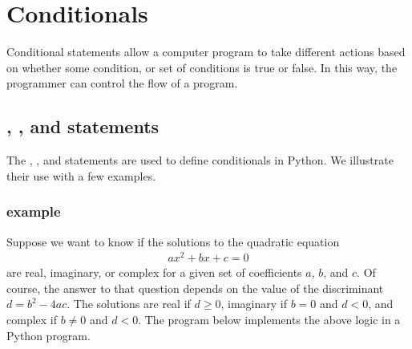 \documentclass[letterpaper,10pt,english]{sphinxmanual}
\begin{document}
\ignorespaces 

\section{Conditionals}
\label{\detokenize{chap6/chap6_loopsconds:conditionals}}\label{\detokenize{chap6/chap6_loopsconds:index-0}}
\sphinxAtStartPar
Conditional statements allow a computer program to take different actions based on whether some condition, or set of conditions is true or false.  In this way, the programmer can control the flow of a program.


\subsection{, , and  statements}
\label{\detokenize{chap6/chap6_loopsconds:if-elif-and-else-statements}}
\sphinxAtStartPar
The , , and  statements are used to define conditionals in Python.  We illustrate their use with a few examples.


\subsubsection{\sphinxhyphen{}\sphinxhyphen{} example}
\label{\detokenize{chap6/chap6_loopsconds:if-elif-else-example}}
\sphinxAtStartPar
Suppose we want to know if the solutions to the quadratic equation
\begin{equation*}
\begin{split}ax^2 + bx + c = 0\end{split}
\end{equation*}
\sphinxAtStartPar
are real, imaginary, or complex for a given set of coefficients \(a\), \(b\), and \(c\).  Of course, the answer to that question depends on the value of the discriminant \(d=b^2-4ac\).  The solutions are real if \(d \ge 0\), imaginary if \(b=0\) and \(d < 0\), and complex if \(b \ne 0\) and \(d < 0\).  The program below implements the above logic in a Python program.
\end{document}
